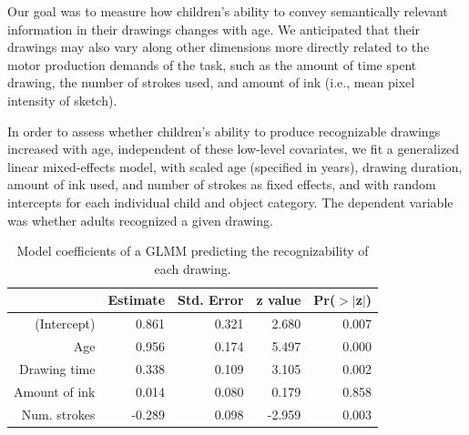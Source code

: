\documentclass[10pt, letterpaper]{article}
\begin{document}
Our goal was to measure how children's ability to convey semantically
relevant information in their drawings changes with age. We anticipated
that their drawings may also vary along other dimensions more directly
related to the motor production demands of the task, such as the amount
of time spent drawing, the number of strokes used, and amount of ink
(i.e., mean pixel intensity of sketch).

In order to assess whether children's ability to produce recognizable
drawings increased with age, independent of these low-level covariates,
we fit a generalized linear mixed-effects model, with scaled age
(specified in years), drawing duration, amount of ink used, and number
of strokes as fixed effects, and with random intercepts for each
individual child and object category. The dependent variable was whether
adults recognized a given drawing.

\begin{table}[H]
\centering
\begin{tabular}{rrrrr}
  \hline
 & Estimate & Std. Error & z value & Pr($>$$|$z$|$) \\
  \hline
(Intercept) & 0.861 & 0.321 & 2.680 & 0.007 \\
  Age & 0.956 & 0.174 & 5.497 & 0.000 \\
  Drawing time & 0.338 & 0.109 & 3.105 & 0.002 \\
  Amount of ink & 0.014 & 0.080 & 0.179 & 0.858 \\
  Num. strokes & -0.289 & 0.098 & -2.959 & 0.003 \\
   \hline
\end{tabular}
\caption{Model coefficients of a GLMM predicting the recognizability of each drawing.}
\end{table}
\end{document}
